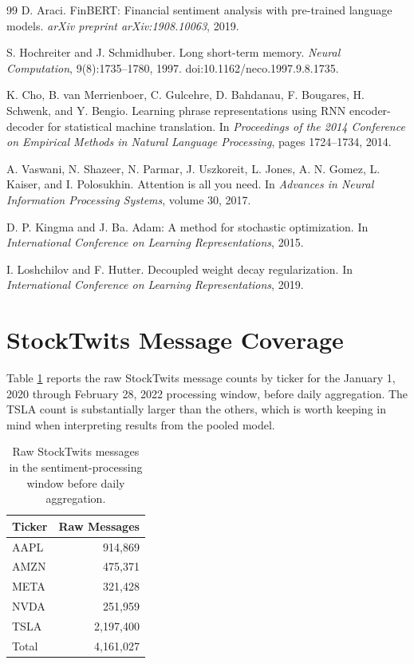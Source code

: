 \documentclass[10pt,twocolumn]{article}
\begin{document}
\begin{thebibliography}{99}
D. Araci.
\newblock FinBERT: Financial sentiment analysis with pre-trained language models.
\newblock \textit{arXiv preprint arXiv:1908.10063}, 2019.

S. Hochreiter and J. Schmidhuber.
\newblock Long short-term memory.
\newblock \textit{Neural Computation}, 9(8):1735--1780, 1997.
\newblock doi:10.1162/neco.1997.9.8.1735.

K. Cho, B. van Merrienboer, C. Gulcehre, D. Bahdanau, F. Bougares, H. Schwenk, and Y. Bengio.
\newblock Learning phrase representations using RNN encoder-decoder for statistical machine translation.
\newblock In \textit{Proceedings of the 2014 Conference on Empirical Methods in Natural Language Processing}, pages 1724--1734, 2014.

A. Vaswani, N. Shazeer, N. Parmar, J. Uszkoreit, L. Jones, A. N. Gomez, L. Kaiser, and I. Polosukhin.
\newblock Attention is all you need.
\newblock In \textit{Advances in Neural Information Processing Systems}, volume 30, 2017.

D. P. Kingma and J. Ba.
\newblock Adam: A method for stochastic optimization.
\newblock In \textit{International Conference on Learning Representations}, 2015.

I. Loshchilov and F. Hutter.
\newblock Decoupled weight decay regularization.
\newblock In \textit{International Conference on Learning Representations}, 2019.

\end{thebibliography}

\clearpage

\appendix

\section{StockTwits Message Coverage}

Table \ref{tab:stocktwits_message_counts} reports the raw StockTwits message counts by ticker for the January 1, 2020 through February 28, 2022 processing window, before daily aggregation. The TSLA count is substantially larger than the others, which is worth keeping in mind when interpreting results from the pooled model.

\begin{table}[h]
\centering
\small
\begin{tabular}{lr}
\toprule
Ticker & Raw Messages \\
\midrule
AAPL & 914{,}869 \\
AMZN & 475{,}371 \\
META & 321{,}428 \\
NVDA & 251{,}959 \\
TSLA & 2{,}197{,}400 \\
\midrule
Total & 4{,}161{,}027 \\
\bottomrule
\end{tabular}
\caption{Raw StockTwits messages in the sentiment-processing window before daily aggregation.}
\label{tab:stocktwits_message_counts}
\end{table}
\end{document}
